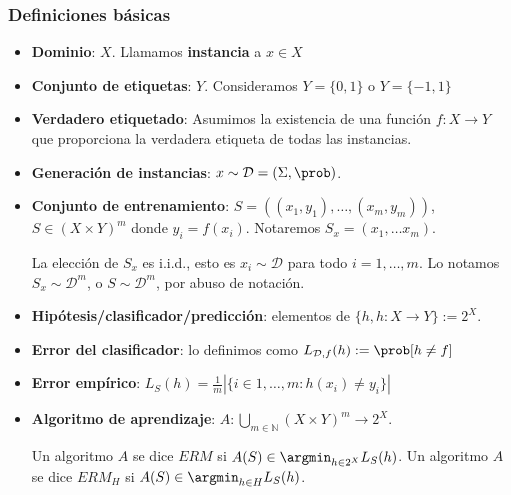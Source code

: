 \begin{frame}\frametitle{Definiciones básicas}
 \vspace{1em}
 \begin{itemize}
  \item \textbf{Dominio}: $X$. Llamamos \textbf{instancia} a $x\in X$

  \item \textbf{Conjunto de etiquetas}: $Y$. Consideramos $Y = \{0,1\}$ o $Y=\{-1,1\}$

  \item \textbf{Verdadero etiquetado}: Asumimos la existencia de una función ${f: X \rightarrow Y}$ 
  que proporciona la verdadera etiqueta de todas las instancias.

  \item \textbf{Generación de instancias}: $x\sim \mathcal{D} = (\Sigma, \prob)$.

  \item \textbf{Conjunto de entrenamiento}: $S = ((x_1,y_1), \ldots, (x_m,y_m))$, $S\in (X \times Y)^m$ donde
  $y_i = f(x_i)$. Notaremos $S_x = (x_1, \ldots x_m)$.

  La elección de $S_x$ es i.i.d., esto es $x_i \sim \mathcal{D}$ para todo $i=1, \ldots, m$.
  Lo notamos $S_x \sim \mathcal{D}^m$, o $S \sim \mathcal{D}^m$, por abuso de notación. 

  \item \textbf{Hipótesis/clasificador/predicción}: elementos de $\{h, h:X \rightarrow Y\} := 2^{X}$. 

  \item \textbf{Error del clasificador}: lo definimos como $L_{\mathcal{D},f}(h) :=  \prob [h \neq f]$

  \item \textbf{Error empírico}: $L_S(h) = \frac{1}{m}|\{i\in {1,\ldots, m}: h(x_i) \neq y_i\}|$
  
  \item \textbf{Algoritmo de aprendizaje}: $A: \underset{m\in \mathbb{N}}{\bigcup} (X\times Y)^m \rightarrow 2^{X}$. 
  
  Un algoritmo $A$ se dice $ERM$ si $A(S) \in \argmin_{h\in 2^X} L_S(h)$.
  Un algoritmo $A$ se dice $ERM_H$ si $A(S) \in \argmin_{h\in H} L_S(h)$.
 \end{itemize}
\end{frame}

